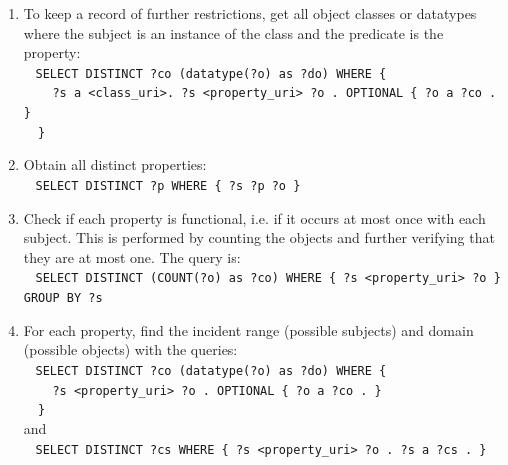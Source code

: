 \documentclass[review]{elsarticle}
\newcommand{\textttt}[1] {\texttt{\footnotesize#1}}
\newcommand{\h} {\hphantom ~ }
\begin{document}
\begin{enumerate}[leftmargin=0cm]
{	\h\h ?s a <class\_uri> . ?s <property\_uri> ?o . ?o a ?oc .\\
        \h\h FILTER(str(?oc) != 'object\_curi')\\
        \h\}}\\
       When \textttt{?cs} is 0, a universal restriction is found. 
\item To keep a record of further restrictions, get all object classes or datatypes where the subject is an instance of the class and the predicate is the property:\\
	\h\textttt{SELECT DISTINCT ?co (datatype(?o) as ?do) WHERE \{\\
        \h\h ?s a <class\_uri>. ?s <property\_uri> ?o . OPTIONAL \{ ?o a ?co . \}\\
        \h\}}
    \item Obtain all distinct properties:\\
        \h\textttt{SELECT DISTINCT ?p WHERE \{ ?s ?p ?o \}}
    \item Check if each property is functional, i.e. if it
        occurs at most once with each subject.
        This is performed by counting the objects and further verifying
        that they are at most one. The query is:\\
        \h\textttt{SELECT DISTINCT (COUNT(?o) as ?co) WHERE \{ ?s
            <property\_uri> ?o \} GROUP BY ?s}
          \item For each property, find the incident range (possible subjects) and domain (possible objects) with the
        queries:\\
        \h\textttt{SELECT DISTINCT ?co (datatype(?o) as ?do) WHERE \{\\
        \h\h ?s <property\_uri> ?o . OPTIONAL \{ ?o a ?co . \}\\
        \h\}} \\
        and \\
        \h\textttt{SELECT DISTINCT ?cs WHERE \{ ?s <property\_uri> ?o . ?s a ?cs . \}}

\end{enumerate}
\end{document}
